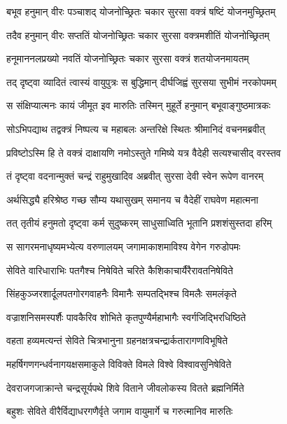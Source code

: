 \twolineshloka
{बभूव हनुमान् वीरः पञ्चाशद् योजनोच्छ्रितः}
{चकार सुरसा वक्त्रं षष्टिं योजनमुच्छ्रितम्} %

\twolineshloka
{तदैव हनुमान् वीरः सप्ततिं योजनोच्छ्रितः}
{चकार सुरसा वक्त्रमशीतिं योजनोच्छ्रितम्} %

\twolineshloka
{हनूमाननलप्रख्यो नवतिं योजनोच्छ्रितः}
{चकार सुरसा वक्त्रं शतयोजनमायतम्} %

\twolineshloka
{तद् दृष्ट्वा व्यादितं त्वास्यं वायुपुत्रः स बुद्धिमान्}
{दीर्घजिह्वं सुरसया सुभीमं नरकोपमम्} %

\twolineshloka
{स संक्षिप्यात्मनः कायं जीमूत इव मारुतिः}
{तस्मिन् मुहूर्ते हनुमान् बभूवाङ्गुष्ठमात्रकः} %

\twolineshloka
{सोऽभिपद्याथ तद्वक्त्रं निष्पत्य च महाबलः}
{अन्तरिक्षे स्थितः श्रीमानिदं वचनमब्रवीत्} %

\twolineshloka
{प्रविष्टोऽस्मि हि ते वक्त्रं दाक्षायणि नमोऽस्तुते}
{गमिष्ये यत्र वैदेही सत्यश्चासीद् वरस्तव} %

\twolineshloka
{तं दृष्ट्वा वदनान्मुक्तं चन्द्रं राहुमुखादिव}
{अब्रवीत् सुरसा देवी स्वेन रूपेण वानरम्} %

\twolineshloka
{अर्थसिद्ध्यै हरिश्रेष्ठ गच्छ सौम्य यथासुखम्}
{समानय च वैदेहीं राघवेण महात्मना} %

\twolineshloka
{तत् तृतीयं हनुमतो दृष्ट्वा कर्म सुदुष्करम्}
{साधुसाध्विति भूतानि प्रशशंसुस्तदा हरिम्} %

\twolineshloka
{स सागरमनाधृष्यमभ्येत्य वरुणालयम्}
{जगामाकाशमाविश्य वेगेन गरुडोपमः} %

\twolineshloka
{सेविते वारिधाराभिः पतगैश्च निषेविते}
{चरिते कैशिकाचार्यैरैरावतनिषेविते} %

\twolineshloka
{सिंहकुञ्जरशार्दूलपतगोरगवाहनैः}
{विमानैः सम्पतद्भिश्च विमलैः समलंकृते} %

\twolineshloka
{वज्राशनिसमस्पर्शैः पावकैरिव शोभिते}
{कृतपुण्यैर्महाभागैः स्वर्गजिद्भिरधिष्ठिते} %

\twolineshloka
{वहता हव्यमत्यन्तं सेविते चित्रभानुना}
{ग्रहनक्षत्रचन्द्रार्कतारागणविभूषिते} %

\twolineshloka
{महर्षिगणगन्धर्वनागयक्षसमाकुले}
{विविक्ते विमले विश्वे विश्वावसुनिषेविते} %

\twolineshloka
{देवराजगजाक्रान्ते चन्द्रसूर्यपथे शिवे}
{विताने जीवलोकस्य वितते ब्रह्मनिर्मिते} %

\twolineshloka
{बहुशः सेविते वीरैर्विद्याधरगणैर्वृते}
{जगाम वायुमार्गे च गरुत्मानिव मारुतिः} %

